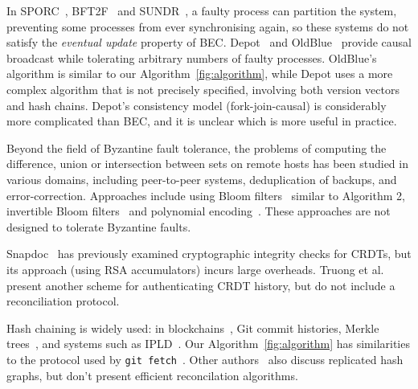\documentclass[a4paper,anonymous,USenglish]{lipics-v2019}
\begin{document}
In SPORC~\cite{Feldman:2010wl}, BFT2F~\cite{Li:2007} and SUNDR~\cite{Mazieres:2002}, a faulty process can partition the system, preventing some processes from ever synchronising again, so these systems do not satisfy the \emph{eventual update} property of BEC.
Depot~\cite{Mahajan:2011} and OldBlue~\cite{VanGundy:2012} provide causal broadcast while tolerating arbitrary numbers of faulty processes.
OldBlue's algorithm is similar to our Algorithm~\ref{fig:algorithm}, while Depot uses a more complex algorithm that is not precisely specified, involving both version vectors and hash chains.
Depot's consistency model (fork-join-causal) is considerably more complicated than BEC, and it is unclear which is more useful in practice.

Beyond the field of Byzantine fault tolerance, the problems of computing the difference, union or intersection between sets on remote hosts has been studied in various domains, including peer-to-peer systems, deduplication of backups, and error-correction.
Approaches include using Bloom filters~\cite{Skjegstad:2011} similar to Algorithm 2, invertible Bloom filters~\cite{Goodrich:2011,Eppstein:2011} and polynomial encoding~\cite{Minsky:2006}.
These approaches are not designed to tolerate Byzantine faults.

Snapdoc~\cite{Kollmann:2019hf} has previously examined cryptographic integrity checks for CRDTs, but its approach (using RSA accumulators) incurs large overheads.
Truong et al.~\cite{Truong:2012et} present another scheme for authenticating CRDT history, but do not include a reconciliation protocol.

Hash chaining is widely used: in blockchains~\cite{Bano:2019}, Git commit histories, Merkle trees~\cite{Merkle:1987}, and systems such as IPLD~\cite{IPLD}.
Our Algorithm~\ref{fig:algorithm} has similarities to the protocol used by \texttt{git fetch}~\cite{GitHTTP}.
Other authors~\cite{Baird:2016tq,Kang:2003} also discuss replicated hash graphs, but don't present efficient reconcilation algorithms.




\end{document}
